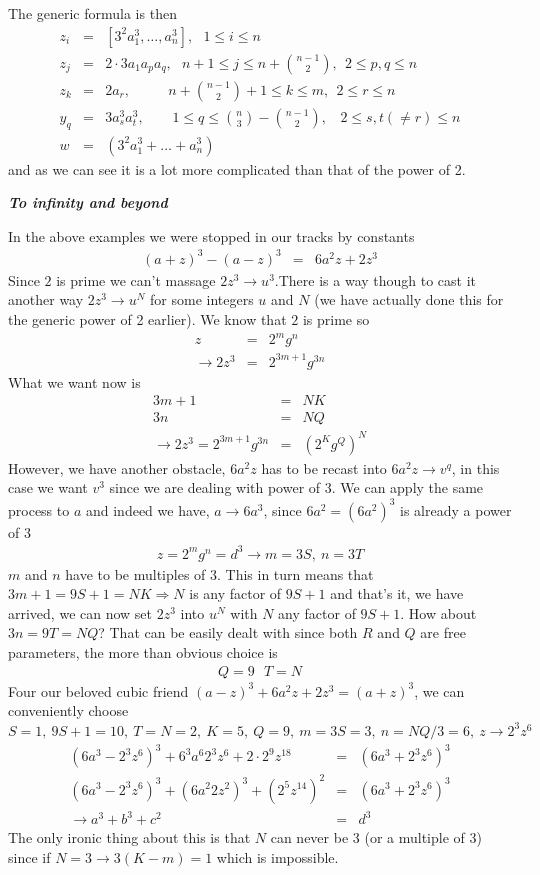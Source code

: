\documentclass[aps,preprint,preprintnumbers,nofootinbib,showpacs,prd]{revtex4-1}
\newcommand{\nbea}{\begin{eqnarray*}}
\newcommand{\neea}{\end{eqnarray*}}
\begin{document}
The generic formula is then
%
\nbea
z_i & = & [3^2 a_1^3, \dots, a_n^3], ~~~ 1 \le i \le n \\
z_j & = &  2 \cdot 3 a_1 a_p a_q, ~~~ n + 1 \le j \le n + {n-1 \choose 2}, ~~ 2 \le p, q \le n \\
z_k & = & 2 a_r, ~~~~~~~~~~~~ n + {n-1 \choose 2} + 1 \le k \le m, ~~ 2 \le r \le n \\
y_q & = & 3 a_s^3 a_t^3, ~~~~~~~~~ 1 \le q \le {n \choose 3} - {n-1 \choose 2} , ~~~~ 2 \le s, t (\neq r) \le n \\
w & = & (3^2 a_1^3+ \dots + a_n^3)
\neea
%
and as we can see it is a lot more complicated than that of the power of 2.

\bigskip\textbf{\textit{To infinity and beyond}}

In the above examples we were stopped in our tracks by constants
%
\nbea
(a+z)^3 - (a-z)^3 & = & 6a^2z + 2z^3
\neea
%
Since $2$ is prime we can't massage $2z^3 \rightarrow u^3$.There is a way though to cast it another way $2z^3 \rightarrow u^N$ for some integers $u$ and $N$ (we have actually done this for the generic power of 2 earlier). We know that $2$ is prime so
%
\nbea
z & = & 2^m g^n \\
\rightarrow 2z^3 & = & 2^{3m+1} g^{3n}
\neea
%
What we want now is
%
\nbea
3m+1 & = & NK \\
3n & = & NQ \\
\rightarrow 2z^3 = 2^{3m+1} g^{3n} & = & (2^K g^Q)^N
\neea
%
However, we have another obstacle, $6a^2z$ has to be recast into $6a^2z \rightarrow v^q$, in this case we want $v^3$ since we are dealing with power of 3. We can apply the same process to $a$ and indeed we have, $a \rightarrow 6 a^3$, since $6a^2 = (6a^2)^3$ is already a power of 3
%
\nbea
z = 2^m g^n = d^3 \rightarrow m = 3S, ~ n = 3T
\neea
%
$m$ and $n$ have to be multiples of 3. This in turn means that $3m+1=9S+1 = NK \Longrightarrow N$ is any factor of $9S+1$ and that's it, we have arrived, we can now set $2z^3$ into $u^N$ with $N$ any factor of $9S+1$. How about $3n=9T = NQ$? That can be easily dealt with since both $R$ and $Q$ are free parameters, the more than obvious choice is
%
\nbea
Q = 9 ~~~ T = N
\neea
%
Four our beloved cubic friend $(a-z)^3 + 6a^2z + 2z^3 = (a+z)^3$, we can conveniently choose $S=1,~9S+1 = 10, ~ T=N=2, ~K=5, ~ Q=9, ~m=3S=3, ~n=NQ/3 =6, ~ z \rightarrow 2^3 z^{6}$
%
\nbea
(6 a^3 - 2^3 z^6)^3 + 6^3 a^6 2^3 z^{6} + 2 \cdot 2^9 z^{18} & = & (6 a^3 + 2^3 z^6)^3 \\
(6 a^3 - 2^3 z^{6})^3 + (6 a^2 2 z^2)^3 + (2^{5} z^{14})^2 & = & (6 a^3 + 2^3 z^{6})^3 \\
\rightarrow a^3 + b^3 + c^2 & = & d^3
\neea
%
The only ironic thing about this is that $N$ can never be 3 (or a multiple of 3) since if $N=3 \rightarrow 3(K-m)=1$ which is impossible.
\end{document}
